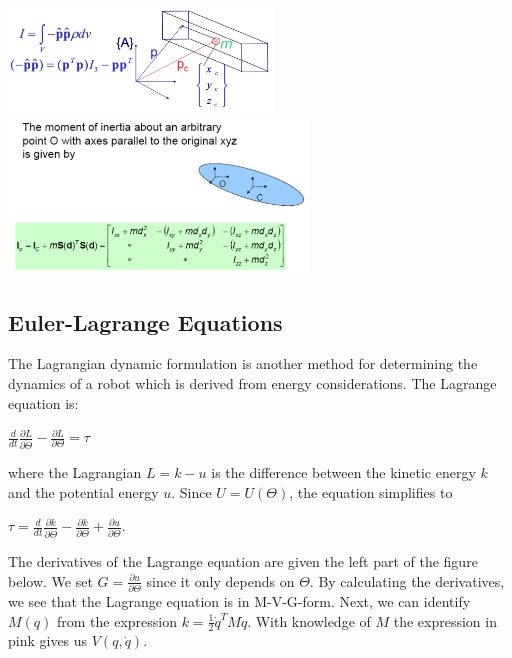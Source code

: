 \begin{center}
\includegraphics[width=7cm]{sections/imgs/6_parallel_axes.png}
\hfill
\includegraphics[width=8cm]{sections/imgs/38.png}
\end{center}


\subsection{Euler-Lagrange Equations}

The Lagrangian dynamic formulation is another method for determining the dynamics of a robot which is derived from energy considerations. The Lagrange equation is:

\begin{center}
	$\frac{d}{dt} \frac{\partial L}{\partial \dot{\Theta}} - \frac{\partial L}{\partial \Theta} = \tau$
\end{center}

where the Lagrangian $L=k-u$ is the difference between the kinetic energy $k$ and the potential energy $u$. Since $U=U(\Theta)$, the equation simplifies to

\begin{center}
	$\tau=\frac{d}{d t} \frac{\partial k}{\partial \dot{\Theta}}-\frac{\partial k}{\partial \Theta}+\frac{\partial u}{\partial \Theta}$.
\end{center}

The derivatives of the Lagrange equation are given the left part of the figure below. We set $G=\frac{\partial u}{\partial \Theta}$ since it only depends on $\Theta$. By calculating the derivatives, we see that the Lagrange equation is in M-V-G-form. Next, we can identify $M(q)$ from the expression $k=\frac{1}{2} \dot{q}^{T} M \dot{q}$. With knowledge of $M$ the expression in pink gives us $V(q, \dot{q})$.
\\

